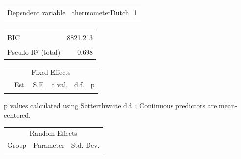 \begin{table}[!h]
\centering
\begin{tabular}{lr}
\toprule
\cellcolor{gray!6}{Observations} & \cellcolor{gray!6}{1225}\\
Dependent variable & thermometerDutch\_1\\
\cellcolor{gray!6}{Type} & \cellcolor{gray!6}{Mixed effects linear regression}\\
\bottomrule
\end{tabular}
\end{table} \begin{table}[!h]
\centering
\begin{tabular}{lr}
\toprule
\cellcolor{gray!6}{AIC} & \cellcolor{gray!6}{8805.880}\\
BIC & 8821.213\\
\cellcolor{gray!6}{Pseudo-R² (fixed effects)} & \cellcolor{gray!6}{0.000}\\
Pseudo-R² (total) & 0.698\\
\bottomrule
\end{tabular}
\end{table} \begin{table}[!h]
\centering
\begin{threeparttable}
\begin{tabular}{lrrrrr}
\toprule
\multicolumn{6}{c}{Fixed Effects} \\
\cmidrule(l{3pt}r{3pt}){1-6}
  & Est. & S.E. & t val. & d.f. & p\\
\midrule
\cellcolor{gray!6}{(Intercept)} & \cellcolor{gray!6}{71.338} & \cellcolor{gray!6}{2.695} & \cellcolor{gray!6}{26.466} & \cellcolor{gray!6}{22.053} & \cellcolor{gray!6}{0.000}\\
\bottomrule
\end{tabular}
\begin{tablenotes}
\item  p values calculated using Satterthwaite d.f. ; Continuous predictors are mean-centered.
\end{tablenotes}
\end{threeparttable}
\end{table} \begin{table}[!h]
\centering
\begin{tabular}{lll}
\toprule
\multicolumn{3}{c}{Random Effects} \\
\cmidrule(l{3pt}r{3pt}){1-3}
Group & Parameter & Std. Dev.\\
\midrule
\cellcolor{gray!6}{PID} & \cellcolor{gray!6}{(Intercept)} & \cellcolor{gray!6}{12.797}\\

\end{tabular}
\end{table}
